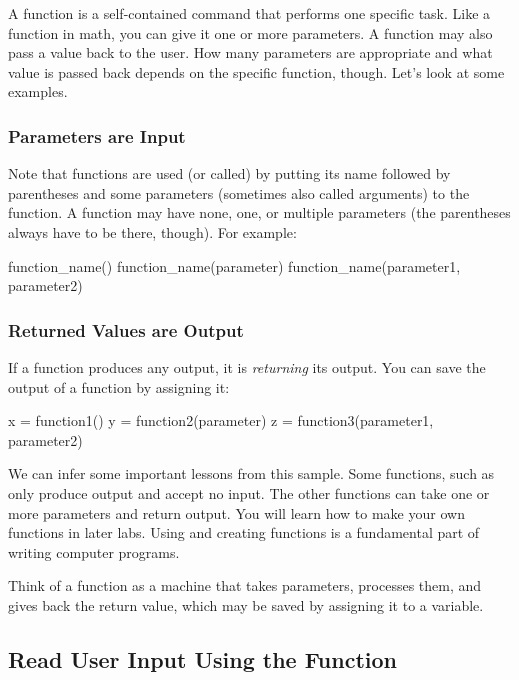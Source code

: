 \documentclass[11pt]{cselabheader}
\begin{document}
A function is a self-contained command that performs one specific task.
Like a function in math, you can give it one or more parameters. A function may
also pass a value back to the user. How many parameters are appropriate and what
value is passed back depends on the specific function, though.
Let's look at some examples.

\subsubsection{Parameters are Input}

Note that functions are used (or called) by putting its
name followed by parentheses and some parameters
(sometimes also called arguments) to the function. A
function may have none, one, or multiple parameters (the parentheses
always have to be there, though). For example:

\begin{python3code}
function_name()
function_name(parameter)
function_name(parameter1, parameter2)
\end{python3code}

\subsubsection{Returned Values are Output}

If a function produces any output, it is
\textsl{returning} its output.  You can save the output of a
function by assigning it:

\begin{python3code}
x = function1()
y = function2(parameter)
z = function3(parameter1, parameter2)
\end{python3code}

We can infer some important lessons from this sample.
Some functions, such as  only produce output
and accept no input.
The other functions can take one or more parameters and return output.
You will learn how to make your own functions in later labs. Using and
creating functions is a fundamental part of writing computer programs.

Think of a function as a machine that takes parameters,
processes them, and gives back the return value, which may be
saved by assigning it to a variable.

\subsection{\texorpdfstring%
  {Read User Input Using the  Function}
  {Read User Input Using the input() Function}}
\end{document}
